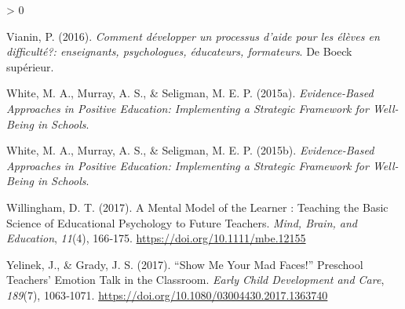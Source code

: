 \documentclass[
  french,
]{article}
\newlength{\cslhangindent}
\newenvironment{CSLReferences}[2] %
 {%
  \setlength{\parindent}{0pt}
  \ifodd #1 \everypar{\setlength{\hangindent}{\cslhangindent}}\ignorespaces\fi
  \ifnum #2 > 0
  \setlength{\parskip}{#2\baselineskip}
  \fi
 }%
 {}
\begin{document}
\begin{CSLReferences}{1}{0}
\leavevmode\hypertarget{ref-vianin2016}{}%
Vianin, P. (2016). \emph{{Comment développer un processus d'aide pour les élèves en difficulté?: enseignants, psychologues, éducateurs, formateurs}}. {De Boeck supérieur}.

\leavevmode\hypertarget{ref-white2015a}{}%
White, M. A., Murray, A. S., \& Seligman, M. E. P. (2015a). \emph{Evidence-Based Approaches in Positive Education: Implementing a Strategic Framework for Well-Being in Schools}.

\leavevmode\hypertarget{ref-white2015c}{}%
White, M. A., Murray, A. S., \& Seligman, M. E. P. (2015b). \emph{Evidence-Based Approaches in Positive Education: Implementing a Strategic Framework for Well-Being in Schools}.

\leavevmode\hypertarget{ref-willingham2017}{}%
Willingham, D. T. (2017). A {Mental Model} of the {Learner} : {Teaching} the {Basic Science} of {Educational Psychology} to {Future Teachers}. \emph{Mind, Brain, and Education}, \emph{11}(4), 166‑175. \url{https://doi.org/10.1111/mbe.12155}

\leavevmode\hypertarget{ref-yelinek2017}{}%
Yelinek, J., \& Grady, J. S. (2017). {``{Show} Me Your Mad Faces!''} Preschool Teachers' Emotion Talk in the Classroom. \emph{Early Child Development and Care}, \emph{189}(7), 1063‑1071. \url{https://doi.org/10.1080/03004430.2017.1363740}

\end{CSLReferences}
\end{document}
